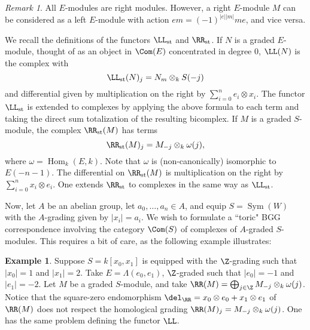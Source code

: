 \documentclass[12pt]{amsart}
\theoremstyle{definition}
\newtheorem{example}[lemma]{Example}
\theoremstyle{remark}
\newtheorem{rem}[lemma]{Remark}
\newcommand{\Hom}{\operatorname{Hom}} %
\newcommand{\Sym}{\operatorname{Sym}} %
\def\on{\operatorname}
\def\o{\omega}
\begin{document}
\begin{rem}
All $E$-modules are right modules. However, a right $E$-module $M$ can be considered as a left $E$-module with action $em = (-1)^{|e||m|}me$, and vice versa.
\end{rem}

We recall the definitions of the functors $\LL_{\on{st}}$ and $\RR_{\on{st}}$. If $N$ is a graded $E$-module, thought of as an object in $\Com(E)$ concentrated in degree 0, $\LL(N)$ is the complex with
$$
\LL_{\on{st}}(N)_j = N_m \otimes_k S(-j)
$$
and differential given by multiplication on the right by $\sum_{i = 0}^n e_i \otimes x_i$. The functor $\LL_{\on{st}}$ is extended to complexes by applying the above formula to each term and taking the direct sum totalization of the resulting bicomplex. If $M$ is a graded $S$-module, the complex $\RR_{\on{st}}(M)$ has terms
$$
\RR_{\on{st}}(M)_j = M_{-j} \otimes_k \o(j), 
$$
where $\o = \Hom_k(E, k)$. Note that $\o$ is (non-canonically) isomorphic to $E(-n-1)$. The differential on $\RR_{\on{st}}(M)$ is multiplication on the right by $ \sum_{i = 0}^n x_i \otimes e_i$. One extends $\RR_{\on{st}}$ to complexes in the same way as $\LL_{\on{st}}$. 




Now, let $A$ be an abelian group, let $a_0, \dots, a_n \in A$, and equip $S = \Sym(W)$ with the $A$-grading given by $|x_i| = a_i$. We wish to formulate a ``toric" BGG correspondence involving the category $\Com(S)$ of complexes of $A$-graded $S$-modules. This requires a bit of care, as the following example illustrates:

\begin{example}
\label{grading}
Suppose $S = k[x_0, x_1]$ is equipped with the $\Z$-grading such that $|x_0| = 1$ and $|x_1| = 2$. Take $E= \Lambda(e_0, e_1)$, $\Z$-graded such that $|e_0| = -1$ and $|e_1| = -2$. Let $M$ be a graded $S$-module, and take $\RR(M) = \bigoplus_{j \in \Z} M_{-j} \otimes_k \o(j)$. Notice that the square-zero endomorphism $\del_{\RR} = x_0 \otimes e_0 + x_1 \otimes e_1$ of $\RR(M)$ does not respect the homological grading $\RR(M)_j = M_{-j} \otimes_k \o(j)$. One has the same problem defining the functor $\LL$.
\end{example}
\end{document}
